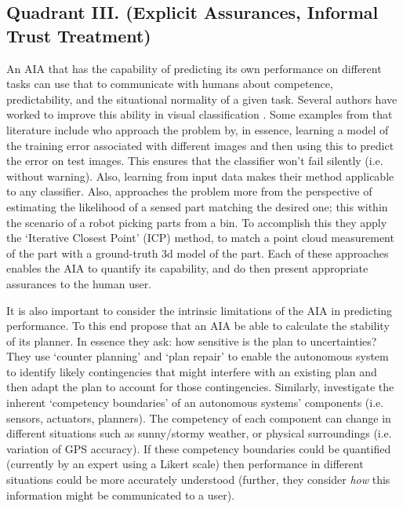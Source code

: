 \subsection{Quadrant III. (Explicit Assurances, Informal Trust Treatment)}\label{sec:q3}
    An AIA that has the capability of predicting its own performance on different tasks can use that to communicate with humans about competence, predictability, and the situational normality of a given task. Several authors have worked to improve this ability in visual classification \cite{Zhang2014-he,Gurau2016-hs,Churchill2015-ei,Kaipa2015-hy}. Some examples from that literature include \citet{Zhang2014-he} who approach the problem by, in essence, learning a model of the training error associated with different images and then using this to predict the error on test images. This ensures that the classifier won't fail silently (i.e. without warning). Also, learning from input data makes their method applicable to any classifier. Also, \citet{Kaipa2015-hy} approaches the problem more from the perspective of estimating the likelihood of a sensed part matching the desired one; this within the scenario of a robot picking parts from a bin. To accomplish this they apply the `Iterative Closest Point' (ICP) method, to match a point cloud measurement of the part with a ground-truth 3d model of the part. Each of these approaches enables the AIA to quantify its capability, and do then present appropriate assurances to the human user.

    It is also important to consider the intrinsic limitations of the AIA in predicting performance. To this end \citet{Kuter2015-qh} propose that an AIA be able to calculate the stability of its planner. In essence they ask: how sensitive is the plan to uncertainties? They use `counter planning' and `plan repair' to enable the autonomous system to identify likely contingencies that might interfere with an existing plan and then adapt the plan to account for those contingencies. Similarly, \citet{Hutchins2015-if} investigate the inherent `competency boundaries' of an autonomous systems' components (i.e. sensors, actuators, planners). The competency of each component can change in different situations such as sunny/stormy weather, or physical surroundings (i.e. variation of GPS accuracy). If these competency boundaries could be quantified (currently by an expert using a Likert scale) then performance in different situations could be more accurately understood (further, they consider \emph{how} this information might be communicated to a user).

